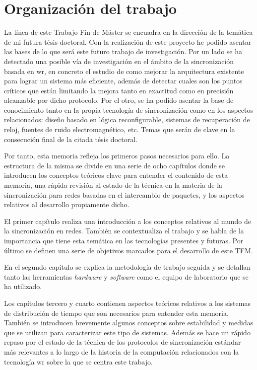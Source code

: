 \section{Organización del trabajo}

La línea de este Trabajo Fin de Máster se encuadra en la dirección de la 
temática de mi futura tésis doctoral. Con la realización de este proyecto he 
podido asentar las bases de lo que será este futuro trabajo de investigación. 
Por un lado se ha detectado una posible vía de investigación en el ámbito de la 
sincronización basada en \gls{wr}, en concreto el estudio de como mejorar la 
arquitectura existente para lograr un sistema más eficiente, además de detectar 
cuales son los puntos críticos que están limitando la mejora tanto en exactitud 
como en precisión alcanzable por dicho protocolo. Por el otro, se ha podido 
asentar la base de conocimiento tanto en la propia tecnología de sincronización 
como en los aspectos relacionados: diseño basado en lógica reconfigurable, 
sistemas de recuperación de reloj, fuentes de ruido electromagnético, etc. 
Temas que serán de clave en la consecución final de la citada tésis doctoral.

Por tanto, esta memoria refleja los primeros pasos necesarios para ello. La 
estructura de la misma se divide en una serie de ocho capítulos donde se 
introducen los conceptos teóricos clave para entender el contenido de esta 
memoria, una rápida revisión al estado de la técnica en la materia de la 
sincronización para redes basadas en el intercambio de paquetes, y los aspectos 
relativos al desarrollo propiamente dicho.

El primer capítulo realiza una introducción a los conceptos relativos al mundo 
de la sincronización en redes. También se contextualiza el trabajo y se habla 
de la importancia que tiene esta temática en las tecnologías presentes y 
futuras. Por último se definen una serie de objetivos marcados para el 
desarrollo de este TFM.

En el segundo capítulo se explica la metodología de trabajo seguida y se 
detallan tanto las herramientas \textit{hardware} y \textit{software} como el 
equipo de laboratorio que se ha utilizado.

Los capítulos tercero y cuarto contienen aspectos teóricos relativos a los 
sistemas de distribución de tiempo que son necesarios para entender esta 
memoria. También se introducen brevemente algunos conceptos sobre estabilidad y 
medidas que se utilizan para caracterizar este tipo de sistemas. Además se hace 
un rápido repaso por el estado de la técnica de los protocolos de 
sincronización estándar más relevantes a lo largo de la historia de la 
computación relacionados con la tecnología \gls{wr} sobre la que se centra este 
trabajo.

